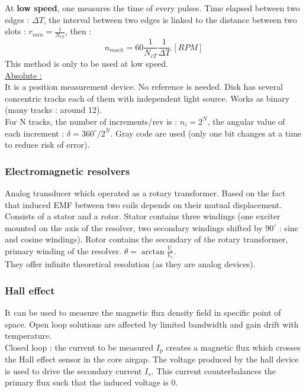 \documentclass[../main.tex]{subfiles}
\begin{document}
At \textbf{low speed}, one measures the time of every pulses. Time elapsed between two edges : $\Delta T$, the interval between two edges is linked to the distance between two slots : $r_{min} = \frac{1}{N_{eT}}$, then : \begin{equation}
    n_{mach} = 60 \frac{1}{N_{eT}} \frac{1}{\Delta T} \: [RPM]
\end{equation}
\warning This method is only to be used at low speed.\\

\quad \underline{Absolute :}\\
It is a position measurement device. No reference is needed. Disk has several concentric tracks each of them with independent light source. Works as binary (many tracks : around 12).\\
For N tracks, the number of increments/rev is : $n_i = 2^N$, the angular value of each increment : $\delta = 360^\circ/2^N$. \warning Gray code are used (only one bit changes at a time to reduce risk of error).\\

\subsubsection{Electromagnetic resolvers}
Analog transducer which operated as a rotary transformer. Based on the fact that induced EMF between two coils depends on their mutual displacement. Consists of a stator and a rotor. Stator contains three windings (one exciter mounted on the axis of the resolver, two secondary windings shifted by $90^\circ$ : sine and cosine windings). Rotor contains the secondary of the rotary transformer, primary winding of the resolver. $\theta = \arctan \frac{V_s}{V_c}$.\\
They offer infinite theoretical resolution (as they are analog devices).\\

\subsubsection{Hall effect}
It can be used to measure the magnetic flux density field in specific point of space. Open loop solutions are affected by limited bandwidth and gain drift with temperature. \\
Closed loop : the current to be measured $I_p$ creates a magnetic flux which crosses the Hall effect sensor in the core airgap. The voltage produced by the hall device is used to drive the secondary current $I_s$. This current counterbalances the primary flux such that the induced voltage is 0. \\
\end{document}
